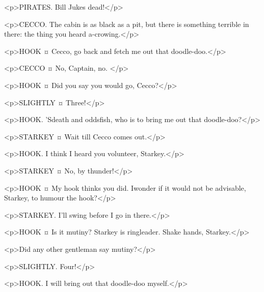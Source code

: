 \begin{drama}
<p>PIRATES. Bill Jukes dead!</p>

<p>CECCO. The cabin is as black as a pit, but there is something terrible in there: the thing you heard a-crowing.</p>

<p>HOOK ¤
Cecco, go back and fetch me out that doodle-doo.</p>

<p>CECCO ¤
No, Captain, no.
</p>

<p>HOOK ¤
Did you say you would go, Cecco?</p>


<p>SLIGHTLY ¤
Three!</p>

<p>HOOK. 'Sdeath and oddsfish, who is to bring me out that doodle-doo?</p>


<p>STARKEY ¤
Wait till Cecco comes out.</p>


<p>HOOK. I think I heard you volunteer, Starkey.</p>

<p>STARKEY ¤
No, by thunder!</p>

<p>HOOK ¤
My hook thinks you did. Iwonder if it would not be advisable, Starkey, to humour the hook?</p>

<p>STARKEY. I'll swing before I go in there.</p>

<p>HOOK ¤
Is it mutiny?
Starkey is ringleader.
Shake hands, Starkey.</p>


<p>Did any other gentleman say mutiny?</p>


<p>SLIGHTLY. Four!</p>

<p>HOOK. I will bring out that doodle-doo myself.</p>



\end{drama}
